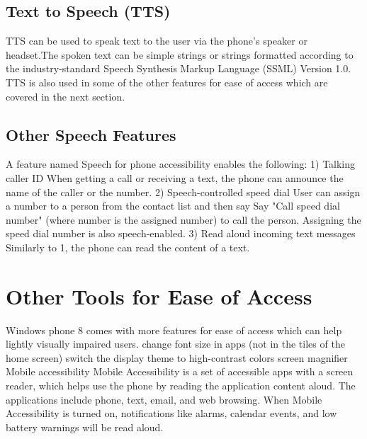 \subsection{Text to Speech (TTS)}
TTS can be used to speak text to the user via the phone’s speaker or headset.The spoken text can be simple strings or strings formatted according to the industry-standard Speech Synthesis Markup Language (SSML) Version 1.0. TTS is also used in some of the other features for ease of access which are covered in the next section.

\subsection{Other Speech Features}
A feature named Speech for phone accessibility enables the following:
1)	Talking caller ID
When getting a call or receiving a text, the phone can announce the name of the caller or the number. 
2)	Speech-controlled speed dial
User can assign a number to a person from the contact list and then say Say "Call speed dial number" (where number is the assigned number) to call the person. Assigning the speed dial number is also speech-enabled.
3)	Read aloud incoming text messages
Similarly to 1, the phone can read the content of a text.

\section{Other Tools for Ease of Access}
Windows phone 8 comes with more features for ease of access which can help lightly visually impaired users.
change font size in apps (not in the tiles of the home screen) 
switch the display theme to high-contrast colors
screen magnifier
Mobile accessibility
Mobile Accessibility is a set of accessible apps with a screen reader, which helps use the phone by reading the application content aloud. The applications include phone, text, email, and web browsing. When Mobile Accessibility is turned on, notifications like alarms, calendar events, and low battery warnings will be read aloud. 


\endinput
